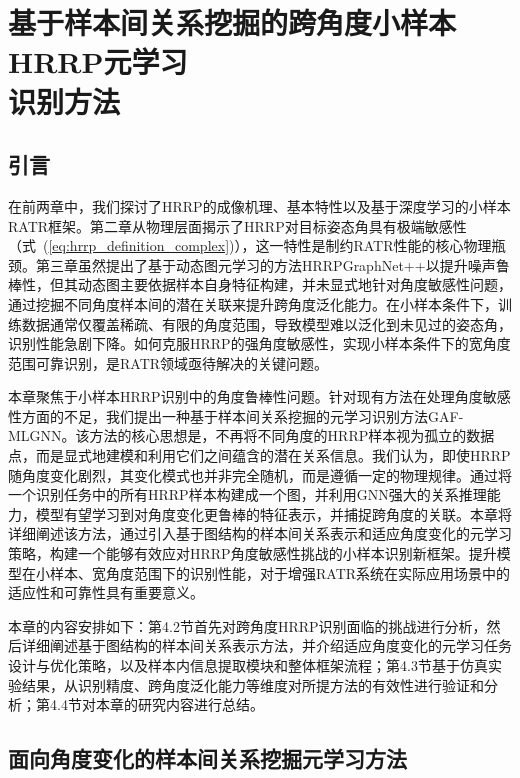 \chapter[基于样本间关系挖掘的跨角度小样本HRRP元学习识别方法]{基于样本间关系挖掘的跨角度小样本HRRP元学习\protect\\ 识别方法}
\label{chap:angle_robust}

\section{引言}
\label{sec:angle_intro}

在前两章中，我们探讨了HRRP的成像机理、基本特性以及基于深度学习的小样本RATR框架。第二章从物理层面揭示了HRRP对目标姿态角具有极端敏感性（式~(\ref{eq:hrrp_definition_complex})），这一特性是制约RATR性能的核心物理瓶颈。第三章虽然提出了基于动态图元学习的方法HRRPGraphNet++以提升噪声鲁棒性，但其动态图主要依据样本自身特征构建，并未显式地针对角度敏感性问题，通过挖掘不同角度样本间的潜在关联来提升跨角度泛化能力。在小样本条件下，训练数据通常仅覆盖稀疏、有限的角度范围，导致模型难以泛化到未见过的姿态角，识别性能急剧下降。如何克服HRRP的强角度敏感性，实现小样本条件下的宽角度范围可靠识别，是RATR领域亟待解决的关键问题。

本章聚焦于小样本HRRP识别中的角度鲁棒性问题。针对现有方法在处理角度敏感性方面的不足，我们提出一种基于样本间关系挖掘的元学习识别方法GAF-MLGNN。该方法的核心思想是，不再将不同角度的HRRP样本视为孤立的数据点，而是显式地建模和利用它们之间蕴含的潜在关系信息。我们认为，即使HRRP随角度变化剧烈，其变化模式也并非完全随机，而是遵循一定的物理规律。通过将一个识别任务中的所有HRRP样本构建成一个图，并利用GNN强大的关系推理能力，模型有望学习到对角度变化更鲁棒的特征表示，并捕捉跨角度的关联。本章将详细阐述该方法，通过引入基于图结构的样本间关系表示和适应角度变化的元学习策略，构建一个能够有效应对HRRP角度敏感性挑战的小样本识别新框架。提升模型在小样本、宽角度范围下的识别性能，对于增强RATR系统在实际应用场景中的适应性和可靠性具有重要意义。

本章的内容安排如下：第4.2节首先对跨角度HRRP识别面临的挑战进行分析，然后详细阐述基于图结构的样本间关系表示方法，并介绍适应角度变化的元学习任务设计与优化策略，以及样本内信息提取模块和整体框架流程；第4.3节基于仿真实验结果，从识别精度、跨角度泛化能力等维度对所提方法的有效性进行验证和分析；第4.4节对本章的研究内容进行总结。

\section{面向角度变化的样本间关系挖掘元学习方法}
\label{sec:angle_method}

